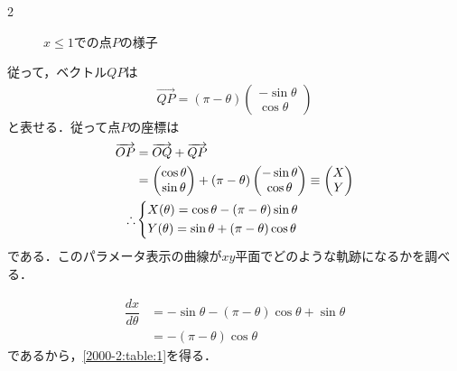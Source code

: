 \documentclass[../../main.tex]{subfiles}
\begin{document}
\begin{multicols}{2}
\begin{figure}[H]
\begin{tikzpicture}[scale=1.5]
    \end{tikzpicture}
    \caption{$x\le 1$での点$P$の様子}
    \label{2000-2:fig:2}
  \end{figure}

  従って，ベクトル$QP$は
  \begin{align}
    \overrightarrow{QP} = (\pi-\theta)
    \begin{pmatrix}
      -\sin\theta \\
      \cos\theta
    \end{pmatrix}
  \end{align}
  と表せる．従って点$P$の座標は
  \begin{align}
    \overrightarrow{OP}
    & = \overrightarrow{OQ} + \overrightarrow{QP}       \nonumber           \\
    & =
    \begin{pmatrix}
      \cos\theta \\
      \sin\theta
    \end{pmatrix}
    + (\pi-\theta)
    \begin{pmatrix}
      -\sin\theta \\
      \cos\theta
    \end{pmatrix}
    \equiv
    \begin{pmatrix}
      X \\
      Y
    \end{pmatrix}       \nonumber                      \\
    \therefore
    &
    \begin{dcases}
      X(\theta) = \cos\theta - (\pi-\theta)\sin\theta \\
      Y(\theta) = \sin\theta + (\pi-\theta)\cos\theta
    \end{dcases}\label{eq:1}
  \end{align}
  である．このパラメータ表示の曲線が$xy$平面でどのような軌跡になるかを調べる．

  \begin{align}
    \dfrac{dx}{d\theta}
    & = -\sin\theta - (\pi-\theta)\cos\theta + \sin\theta \nonumber \\
    & = -(\pi-\theta) \cos\theta  \label{eq:2}
  \end{align}
  であるから，\cref{2000-2:table:1}を得る．


\end{multicols}
\end{document}
